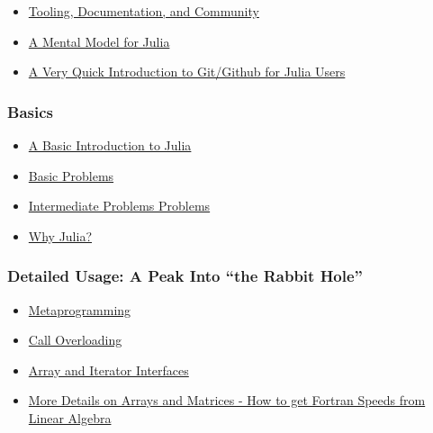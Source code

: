 \documentclass[11pt]{article}
\begin{document}
\begin{itemize}
\itemsep1pt\parskip0pt
\item
  \href{http://ucidatascienceinitiative.github.io/IntroToJulia/Slides/ToolingDocumentationCommunity}{Tooling,
  Documentation, and Community}
\item
  \href{http://ucidatascienceinitiative.github.io/IntroToJulia/Slides/JuliaMentalModel}{A
  Mental Model for Julia}
\item
  \href{http://ucidatascienceinitiative.github.io/IntroToJulia/Slides/GithubIntroduction}{A
  Very Quick Introduction to Git/Github for Julia Users}
\end{itemize}

\subsubsection{Basics}\label{basics}

\begin{itemize}
\itemsep1pt\parskip0pt
\item
  \href{http://ucidatascienceinitiative.github.io/IntroToJulia/Slides/BasicIntroduction}{A
  Basic Introduction to Julia}
\item
  \href{http://ucidatascienceinitiative.github.io/IntroToJulia/Slides/BasicProblems}{Basic
  Problems}
\item
  \href{http://ucidatascienceinitiative.github.io/IntroToJulia/Slides/BasicProblems}{Intermediate
  Problems Problems}
\item
  \href{http://ucidatascienceinitiative.github.io/IntroToJulia/Slides/WhyJulia}{Why
  Julia?}
\end{itemize}

\subsubsection{Detailed Usage: A Peak Into ``the Rabbit
Hole''}\label{detailed-usage-a-peak-into-the-rabbit-hole}

\begin{itemize}
\itemsep1pt\parskip0pt
\item
  \href{http://ucidatascienceinitiative.github.io/IntroToJulia/Slides/Metaprogramming}{Metaprogramming}
\item
  \href{http://ucidatascienceinitiative.github.io/IntroToJulia/Slides/CallOverloading}{Call
  Overloading}
\item
  \href{http://ucidatascienceinitiative.github.io/IntroToJulia/Slides/ArrayIteratorInterfaces}{Array
  and Iterator Interfaces}
\item
  \href{http://ucidatascienceinitiative.github.io/IntroToJulia/Slides/ArraysAndMatrices}{More
  Details on Arrays and Matrices - How to get Fortran Speeds from Linear
  Algebra}
\end{itemize}
\end{document}
